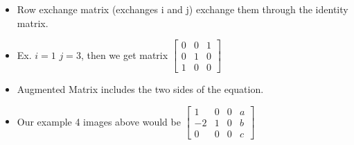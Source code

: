 \begin{itemize}
    \item Row exchange matrix (exchanges i and j) exchange them through the identity matrix. 
    \item Ex. $i=1$ $j=3$, then we get matrix $\begin{bmatrix}0&0&1\\0&1&0\\1&0&0\end{bmatrix}$
    \item Augmented Matrix includes the two sides of the equation.
    \item Our example 4 images above would be $\begin{bmatrix}1&0&0&a\\-2&1&0&b\\0&0&0&c\end{bmatrix}$
    
\end{itemize}